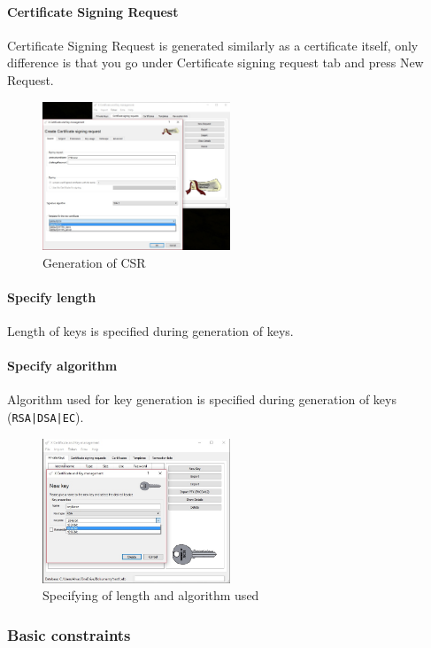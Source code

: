 \documentclass[10pt, a4paper]{report}
\begin{document}
      \paragraph{Certificate Signing Request}
Certificate Signing Request is generated similarly as a certificate itself, only difference is that you go under Certificate signing request tab and press New Request.
\begin{figure}[!ht]
 \caption{Generation of CSR}
 \centering
  \includegraphics[width=0.5\textwidth]{../Dependancies/XCA/newCSR.jpg}
\end{figure}

      \paragraph{Specify length}
Length of keys is specified during generation of keys.
      \paragraph{Specify algorithm}
Algorithm used for key generation is specified during generation of keys (\verb+RSA|DSA|EC+).
\begin{figure}[!ht]
 \caption{Specifying of length and algorithm used}
 \centering
  \includegraphics[width=0.5\textwidth]{../Dependancies/XCA/genKeylength.jpg}
\end{figure}


    \subsubsection{Basic constraints}
    
\end{document}
